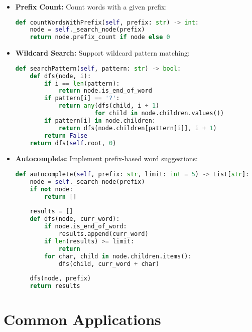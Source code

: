 \begin{itemize}
    \item \textbf{Prefix Count:} Count words with a given prefix:
    \begin{lstlisting}[language=Python]
def countWordsWithPrefix(self, prefix: str) -> int:
    node = self._search_node(prefix)
    return node.prefix_count if node else 0
    \end{lstlisting}

    \item \textbf{Wildcard Search:} Support wildcard pattern matching:
    \begin{lstlisting}[language=Python]
def searchPattern(self, pattern: str) -> bool:
    def dfs(node, i):
        if i == len(pattern):
            return node.is_end_of_word
        if pattern[i] == '?':
            return any(dfs(child, i + 1) 
                      for child in node.children.values())
        if pattern[i] in node.children:
            return dfs(node.children[pattern[i]], i + 1)
        return False
    return dfs(self.root, 0)
    \end{lstlisting}

    \item \textbf{Autocomplete:} Implement prefix-based word suggestions:
    \begin{lstlisting}[language=Python]
def autocomplete(self, prefix: str, limit: int = 5) -> List[str]:
    node = self._search_node(prefix)
    if not node:
        return []
    
    results = []
    def dfs(node, curr_word):
        if node.is_end_of_word:
            results.append(curr_word)
        if len(results) >= limit:
            return
        for char, child in node.children.items():
            dfs(child, curr_word + char)
            
    dfs(node, prefix)
    return results
    \end{lstlisting}
\end{itemize}

\section*{Common Applications}

